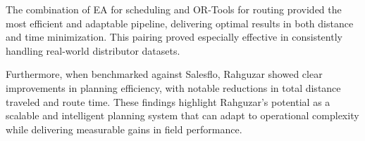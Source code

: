 The combination of EA for scheduling and OR-Tools for routing provided the most efficient and adaptable pipeline, delivering optimal results in both distance and time minimization. This pairing proved especially effective in consistently handling real-world distributor datasets.

Furthermore, when benchmarked against Salesflo, Rahguzar showed clear improvements in planning efficiency, with notable reductions in total distance traveled and route time. These findings highlight Rahguzar’s potential as a scalable and intelligent planning system that can adapt to operational complexity while delivering measurable gains in field performance.